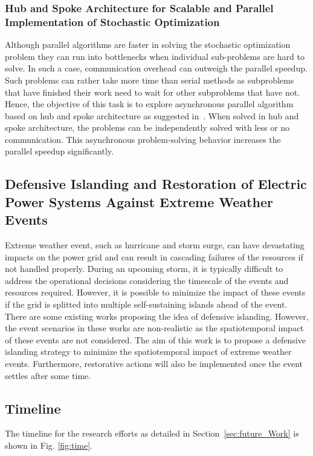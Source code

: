 \subsubsection{Hub and Spoke Architecture for Scalable and Parallel Implementation of Stochastic Optimization}
Although parallel algorithms are faster in solving the stochastic optimization problem they can run into bottlenecks when individual sub-problems are hard to solve. In such a case, communication overhead can outweigh the parallel speedup. Such problems can rather take more time than serial methods as subproblems that have finished their work need to wait for other subproblems that have not. Hence, the objective of this task is to explore asynchronous parallel algorithm based on hub and spoke architecture as suggested in~\cite{knueven2020parallel}. When solved in hub and spoke architecture, the problems can be independently solved with less or no communication. This asynchronous problem-solving behavior increases the parallel speedup significantly. 

\subsection{Defensive Islanding and Restoration of Electric Power Systems Against Extreme Weather Events}
Extreme weather event, such as hurricane and storm surge, can have devastating impacts on the power grid and can result in cascading failures of the resources if not handled properly. During an upcoming storm, it is typically difficult to address the operational decisions considering the timescale of the events and resources required. However, it is possible to minimize the impact of these events if the grid is splitted into multiple self-sustaining islands ahead of the event. There are some existing works proposing the idea of defensive islanding. However, the event scenarios in these works are non-realistic as the spatiotemporal impact of these events are not considered. The aim of this work is to propose a defensive islanding strategy to minimize the spatiotemporal impact of extreme weather events. Furthermore, restorative actions will also be implemented once the event settles after some time.    

\clearpage
\subsection{Timeline}
The timeline for the research efforts as detailed in Section~\ref{sec:future_Work} is shown in Fig. \ref{fig:time}.


